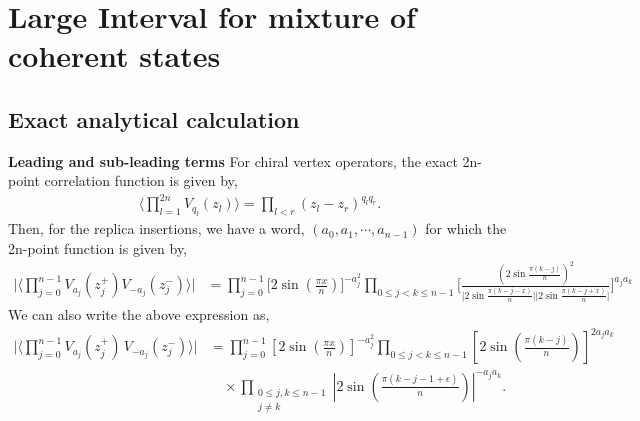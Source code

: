 \documentclass[11pt]{article}
\newcommand{\lb}{\left(}
\newcommand{\rb}{\right)}
\begin{document}
\section{Large Interval for mixture of coherent states}
\subsection{Exact analytical calculation}
\textbf{Leading and sub-leading terms}
For chiral vertex operators, the exact 2n-point correlation function is given by,
\begin{align}
    \Big\langle \prod_{l=1}^{2n}V_{q_l}(z_l)\Big\rangle = \prod_{l<r} (z_l - z_r)^{q_lq_r}.
\end{align}
Then, for the replica insertions, we have a word, 
$(a_0, a_1, \cdots, a_{n-1})$ for which the 2n-point function is given by,
\begin{align}
    \Bigg| \Big\langle \prod_{j=0}^{n-1}V_{a_j}(z_j^+) V_{-a_j}(z_j^-) \Big\rangle \Bigg| &= \prod_{j=0}^{n-1}\Big[ 2\sin \lb\frac{\pi x}{n}\rb  \Big]^{-a_j^2} \prod_{0\leq j <k \leq n-1}\Bigg[\frac{\lb2\sin\frac{\pi (k-j)}{n}\rb^2}{\Big|2\sin \frac{\pi (k-j-x)}{n}\Big| \Big|2\sin \frac{\pi (k-j+x)}{n}\Big|}\Bigg]^{a_ja_k}
\end{align}
We can also write the above expression as,
\begin{align}
\Bigg|
\Bigg\langle
\prod_{j=0}^{n-1}
V_{a_j}(z_j^+)\,
V_{-a_j}(z_j^-)
\Bigg\rangle
\Bigg|
&=
\prod_{j=0}^{n-1}
\left[
2\sin\left(\frac{\pi x}{n}\right)
\right]^{-a_j^2}
\prod_{0\leq j<k\leq n-1}
\left[
2\sin\left(\frac{\pi(k-j)}{n}\right)
\right]^{2a_ja_k}
\nonumber\\
&\quad\times
\prod_{\substack{0\leq j,k\leq n-1\\ j\neq k}}
\left|
2\sin\left(
\frac{\pi(k-j-1+\epsilon)}{n}
\right)
\right|^{-a_ja_k}.
\end{align}
\end{document}
